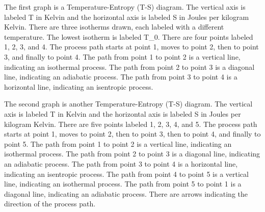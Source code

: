 The first graph is a Temperature-Entropy (T-S) diagram. The vertical axis is labeled T in Kelvin and the horizontal axis is labeled S in Joules per kilogram Kelvin. There are three isotherms drawn, each labeled with a different temperature. The lowest isotherm is labeled T_0. There are four points labeled 1, 2, 3, and 4. The process path starts at point 1, moves to point 2, then to point 3, and finally to point 4. The path from point 1 to point 2 is a vertical line, indicating an isothermal process. The path from point 2 to point 3 is a diagonal line, indicating an adiabatic process. The path from point 3 to point 4 is a horizontal line, indicating an isentropic process.

The second graph is another Temperature-Entropy (T-S) diagram. The vertical axis is labeled T in Kelvin and the horizontal axis is labeled S in Joules per kilogram Kelvin. There are five points labeled 1, 2, 3, 4, and 5. The process path starts at point 1, moves to point 2, then to point 3, then to point 4, and finally to point 5. The path from point 1 to point 2 is a vertical line, indicating an isothermal process. The path from point 2 to point 3 is a diagonal line, indicating an adiabatic process. The path from point 3 to point 4 is a horizontal line, indicating an isentropic process. The path from point 4 to point 5 is a vertical line, indicating an isothermal process. The path from point 5 to point 1 is a diagonal line, indicating an adiabatic process. There are arrows indicating the direction of the process path.